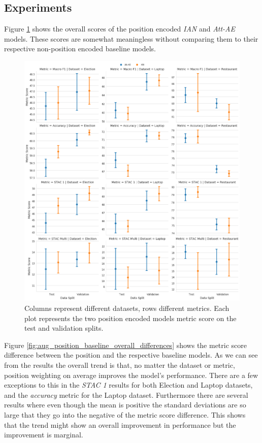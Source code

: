 \FloatBarrier
\subsection{Experiments}

Figure \ref{fig:aug_overall_position_scores} shows the overall scores of the position encoded \textit{IAN} and \textit{Att-AE} models. These scores are somewhat meaningless without comparing them to their respective non-position encoded baseline models.

\begin{figure}[h!]
    \centering
    \includegraphics[scale=0.4]{images/augmentation/methods_performance/Position_Encoding/overall_position_scores.png}
    \caption{Columns represent different datasets, rows different metrics. Each plot represents the two position encoded models metric score on the test and validation splits.}
    \label{fig:aug_overall_position_scores}
\end{figure}

Figure \ref{fig:aug_position_baseline_overall_differences} shows the metric score difference between the position and the respective baseline models. As we can see from the results the overall trend is that, no matter the dataset or metric, position weighting on average improves the model's performance. There are a few exceptions to this in the \textit{STAC 1} results for both Election and Laptop datasets, and the \textit{accuracy} metric for the Laptop dataset. Furthermore there are several results where even though the mean is positive the standard deviations are so large that they go into the negative of the metric score difference. This shows that the trend might show an overall improvement in performance but the improvement is marginal.

